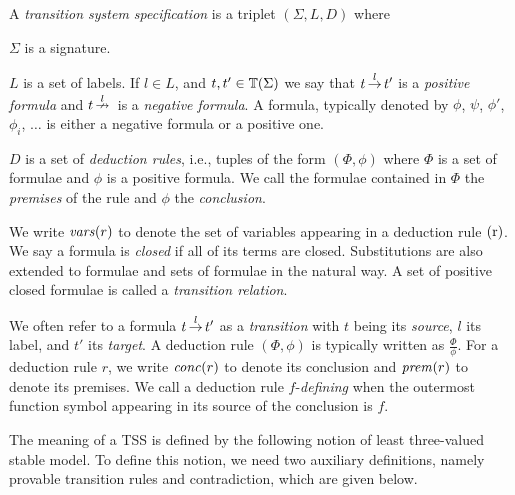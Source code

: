 \begin{definition}
    A \emph{transition system specification} is a triplet $(\Sigma, L, D)$ where
    \begin{bullets}
        \item $\Sigma$ is a signature.
        \item $L$ is a set of labels. If $l \in L$, and $t,t'\in \mathbb{T}(\Sigma)$
              we say that $t \,{\stackrel{{l}}{\rightarrow}}\, t'$ is a \emph{positive formula} and
              $t \,{\stackrel{{l}}{\nrightarrow}}\,$ is a \emph{negative formula}. A formula, typically denoted by $\phi$, $\psi$, $\phi'$, $\phi_i$, $\ldots$
              is either a negative formula or a positive one.
        \item $D$ is a set of \emph{deduction rules}, i.e., tuples of the form $(\Phi,\phi)$ where $\Phi$ is a set of
              formulae and $\phi$ is a positive formula. We call the formulae contained in $\Phi$ the \emph{premises} of the rule and $\phi$ the
              \emph{conclusion}.
    \end{bullets}
    We write $\mathit{vars}(r)$ to denote the set of variables appearing in a deduction rule $\mathrm{(r)}$.
    We say a formula is \emph{closed} if all of its terms are closed. Substitutions are also extended to formulae
    and sets of formulae in the natural way. A set of positive closed formulae is called a \emph{transition relation}.
\end{definition}

We often refer to a formula $t \,{\stackrel{{l}}{\rightarrow}}\, t'$ as a \emph{transition} with $t$ being its \emph{source}, $l$ its label, and $t'$
its \emph{target}.
A deduction rule $(\Phi,\phi)$ is typically written as $\frac{\Phi}{\phi}$. For a deduction rule $r$, we write $\mathit{conc}(r)$ to denote its conclusion and $\mathit{prem}(r)$ to denote its premises.
We call a deduction rule $f$-\emph{defining} when the outermost function symbol appearing in its source of the conclusion is $f$.


The meaning of a TSS is defined by the following notion of least three-valued stable model.
To define this notion, we need two auxiliary definitions, namely provable transition rules and contradiction, which are given below.

